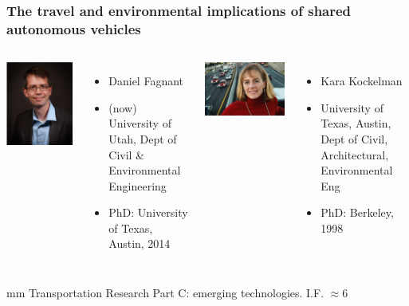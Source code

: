 \documentclass{beamer}
\begin{document}
\begin{frame}
  \frametitle{The travel and environmental implications of shared autonomous vehicles}
  \begin{columns}
    \includegraphics[height=0.3\textheight]{Fagnant.jpg}
    \begin{itemize}
    \item Daniel Fagnant
    \item (now) University of Utah, Dept of Civil \& Environmental Engineering
    \item PhD: University of Texas, Austin, 2014
    \end{itemize}
    \includegraphics[height=0.3\textheight]{Kockelman.jpg}
    \begin{itemize}
    \item Kara Kockelman
    \item University of Texas, Austin, Dept of Civil, Architectural, Environmental Eng
    \item PhD: Berkeley, 1998
    \end{itemize}
  \end{columns}
   mm
  Transportation Research Part C: emerging technologies. I.F. $\approx 6$
\end{frame}
\end{document}
